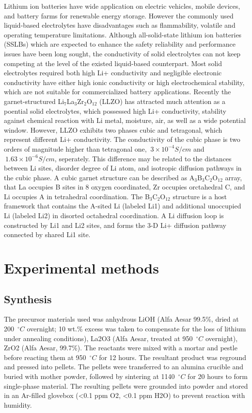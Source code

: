 \documentclass[twoside,twocolumn,9pt]{article}
\begin{document}
Lithium ion batteries have wide application on electric vehicles, mobile devices, and battery
farms for renewable energy storage.  However the commonly used liquid-based electrolytes have
disadvantages such as flammability, volatile  and operating temperature limitations.
Although all-solid-state lithium ion batteries (SSLBs) which are expected to enhance the safety
reliability and performance issues have been long sought, the conductivity of solid electrolytes can not
keep competing at the level of the existed liquid-based counterpart. Most solid electrolytes required both high Li+ conductivity and negligible electronic
conductivity have either high ionic conductivity or high electrochemical stability, which are not suitable for commercialized battery applications.
 Recently the garnet-structured
 Li$_7$La$_3$Zr$_2$O$_12$ (LLZO)\cite{ANIE:ANIE200701144} has attracted much attention as a poential solid electrolytes, which possessed high Li+ conductivity, stability against chemical
reaction with Li metal, moisture, air, as well as a wide potential window. However, LLZO exhibits two phases\cite{ic101914e}
cubic and tetragonal, which represent different Li+ conductivity. The conductivity of the cubic
phase is two orders of magnitude higher than tetragonal one, $~3\times 10^{-4} S/cm$\cite{ANIE:ANIE200701144}
and $~1.63\times 10^{-6} S/cm$\cite{AWAKA20092046}, seperately.
This difference may be related to the distances between Li sites, disorder degree of Li atom, and isotropic diffusion pathways in the cubic phase.
A cubic garnet structure can be described\cite{CUSSEN2011470} as A$_3$B$_3$C$_2$O$_{12}$ array, that La occupies B sites in 8 oxygen coordinated, Zr occupies orctahedral C,
and Li occupies A in tetrahedral coordination. The B$_3$C$_2$O$_{12}$ structure \cite{doi:10.1246/cl.2011.60} is a host framework that contains the A-sited Li (labeled Li1) and additional
unoccupied Li (labeled Li2) in disorted octahedral coordination. A Li diffusion loop is constructed by Li1 and Li2 sites, and forms the 3-D Li+ diffusion pathway connected by
shared Li1 site.

\section{Experimental methods}

\subsection{Synthesis}
The precursor materials used was anhydrous LiOH (Alfa Aesar 99.5\%, dried at 200~$^{\circ}C$ overnight; 10 wt.\% excess was taken to compensate for the loss of lithium under annealing conditions), La2O3 (Alfa Aesar, treated at 950~$^{\circ}C$ overnight), ZrO2 (Alfa Aesar, 99.7\%). The reactants were mixed with a mortar and pestle before reacting them at 950~$^{\circ}C$ for 12 hours. The resultant product was reground and pressed into pellets. The pellets were transferred to an alumina crucible and buried with mother powder, followed by sintering at 1140~$^{\circ}C$ for 20 hours to form single-phase material. The resulting pellets were grounded into powder and stored in an Ar-filled glovebox (<0.1 ppm O2, <0.1 ppm H2O) to prevent reaction with humidity.
\end{document}
